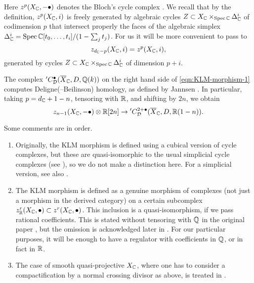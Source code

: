 \documentclass{article}
\numberwithin{equation}{section}
\begin{document}
Here $z^p (X_{\mathbb{C}}, -\bullet)$ denotes the Bloch's cycle complex
\cite{Bloch-1986}. We recall that by the definition, $z^p (X_{\mathbb{C}}, i)$ is freely
generated by algebraic cycles $Z \subset X_{\mathbb{C}} \times_{\operatorname{Spec} \mathbb{C}} \Delta_{\mathbb{C}}^i$
of codimension $p$ that intersect properly the faces of the algebraic simplex
$\Delta_{\mathbb{C}}^i = \operatorname{Spec} \mathbb{C} [t_0,\ldots,t_i]/(1 - \sum_j t_j)$. For us it will be
more convenient to pass to
$$z_{d_{\mathbb{C}} - p} (X_{\mathbb{C}}, i) = z^p (X_{\mathbb{C}}, i),$$
generated by cycles $Z \subset X_{\mathbb{C}} \times_{\operatorname{Spec} \mathbb{C}} \Delta_{\mathbb{C}}^i$ of
dimension $p+i$.

The complex ${}' C_\mathcal{D}^{\bullet} (\overline{X}_{\mathbb{C}}, D, \mathbb{Q} (k))$ on the
right hand side of \eqref{eqn:KLM-morphism-1} computes Deligne(--Beilinson)
homology, as defined by Jannsen \cite{Jannsen-1988}. In particular, taking
$p = d_{\mathbb{C}} + 1 - n$, tensoring with $\mathbb{R}$, and shifting by $2n$, we obtain
\begin{equation}
  \label{eqn:KLM-morphism-2}
  z_{n-1} (X_{\mathbb{C}}, -\bullet) \otimes \mathbb{R} [2n] \to
  {}' C_\mathcal{D}^{2 + \bullet} (\overline{X}_{\mathbb{C}}, D, \mathbb{R} (1-n)).
\end{equation}

\begin{remark}
  Some comments are in order.

  \begin{enumerate}
  \item Originally, the KLM morphism is defined using a cubical version of cycle
    complexes, but these are quasi-isomorphic to the usual simplicial cycle
    complexes (see \cite{Levine-1994}), so we do not make a distinction here.
    For a simplicial version, see also \cite{Kerr-Lewis-Lopatto-2018}.

  \item The KLM morphism is defined as a genuine morphism of complexes (not just
    a morphism in the derived category) on a certain subcomplex
    $z^r_{\mathbb{R}} (X_{\mathbb{C}}, \bullet) \subset z^r (X_{\mathbb{C}}, \bullet)$. This inclusion is a
    quasi-isomorphism, if we pass rational coefficients. This is stated without
    tensoring with $\mathbb{Q}$ in the original paper
    \cite{Kerr-Lewis-Muller-Stach-2006}, but the omission is acknowledged later
    in \cite{Kerr-Lewis-2007}. For our particular purposes, it will be enough to
    have a regulator with coefficients in $\mathbb{Q}$, or in fact in $\mathbb{R}$.

  \item The case of smooth quasi-projective $X_{\mathbb{C}}$, where one has to consider a
    compactification by a normal crossing divisor as above, is treated in
    \cite[\S 5.9]{Kerr-Lewis-Muller-Stach-2006}.
  \end{enumerate}
\end{remark}
\end{document}
